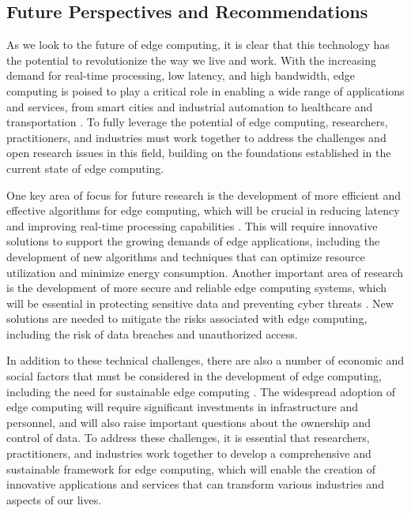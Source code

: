 \documentclass[11pt]{article}
\begin{document}
\subsection{Future Perspectives and Recommendations}

As we look to the future of edge computing, it is clear that this technology has the potential to revolutionize the way we live and work. With the increasing demand for real-time processing, low latency, and high bandwidth, edge computing is poised to play a critical role in enabling a wide range of applications and services, from smart cities and industrial automation to healthcare and transportation \cite{ref2}. To fully leverage the potential of edge computing, researchers, practitioners, and industries must work together to address the challenges and open research issues in this field, building on the foundations established in the current state of edge computing.

One key area of focus for future research is the development of more efficient and effective algorithms for edge computing, which will be crucial in reducing latency and improving real-time processing capabilities \cite{ref160}. This will require innovative solutions to support the growing demands of edge applications, including the development of new algorithms and techniques that can optimize resource utilization and minimize energy consumption. Another important area of research is the development of more secure and reliable edge computing systems, which will be essential in protecting sensitive data and preventing cyber threats \cite{ref15}. New solutions are needed to mitigate the risks associated with edge computing, including the risk of data breaches and unauthorized access.

In addition to these technical challenges, there are also a number of economic and social factors that must be considered in the development of edge computing, including the need for sustainable edge computing \cite{ref51}. The widespread adoption of edge computing will require significant investments in infrastructure and personnel, and will also raise important questions about the ownership and control of data. To address these challenges, it is essential that researchers, practitioners, and industries work together to develop a comprehensive and sustainable framework for edge computing, which will enable the creation of innovative applications and services that can transform various industries and aspects of our lives.
\end{document}
